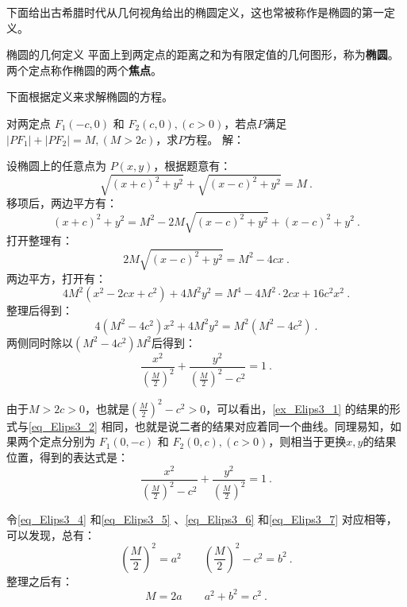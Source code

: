 {下面给出古希腊时代从几何视角给出的椭圆定义，这也常被称作是椭圆的第一定义。

\begin{definition}{椭圆的几何定义}
平面上到两定点的距离之和为有限定值的几何图形，称为\textbf{椭圆}。两个定点称作椭圆的两个\textbf{焦点}。
\end{definition}

下面根据定义来求解椭圆的方程。

\begin{example}{对两定点 $F_1(-c, 0)$ 和 $F_2(c, 0),(c>0)$，若点$P$满足$|PF_1| + |PF_2| = M,(M > 2c)$，求$P$方程。}\label{ex_Elips3_1}
解：

设椭圆上的任意点为 $P(x, y)$，根据题意有：
\begin{equation}
\sqrt{(x + c)^2 + y^2} + \sqrt{(x - c)^2 + y^2} = M~.
\end{equation}
移项后，两边平方有：
\begin{equation}
(x + c)^2 + y^2 = M^2 - 2M\sqrt{(x - c)^2 + y^2} + (x - c)^2 + y^2~.
\end{equation}
打开整理有：
\begin{equation}
2M\sqrt{(x - c)^2 + y^2}= M^2 - 4cx~.
\end{equation}
两边平方，打开有：
\begin{equation}
4M^2(x^2 - 2cx+c^2) + 4M^2y^2= M^4-4M^2\cdot2cx+16c^2x^2~.
\end{equation}
整理后得到：
\begin{equation}
4(M^2 -4c^2)x^2 + 4M^2y^2= M^2(M^2-4c^2)~.
\end{equation}
两侧同时除以$(M^2-4c^2)M^2$后得到：
\begin{equation}\label{eq_Elips3_4}
\frac{x^2}{\left(\displaystyle\frac{M}{2}\right)^2} + \frac{y^2}{\displaystyle\left(\frac{M}{2}\right)^2-c^2}=1~.
\end{equation}
\end{example}

由于$M>2c>0$，也就是$\displaystyle\left(\frac{M}{2}\right)^2-c^2>0$，可以看出，\autoref{ex_Elips3_1} 的结果的形式与\autoref{eq_Elips3_2} 相同，也就是说二者的结果对应着同一个曲线。同理易知，如果两个定点分别为 $F_1(0,-c)$ 和 $F_2(0,c),(c>0)$，则相当于更换$x,y$的结果位置，得到的表达式是：
\begin{equation}\label{eq_Elips3_6}
\frac{x^2}{\displaystyle\left(\frac{M}{2}\right)^2-c^2}+\frac{y^2}{\left(\displaystyle\frac{M}{2}\right)^2} =1~.
\end{equation}

令\autoref{eq_Elips3_4} 和\autoref{eq_Elips3_5} 、\autoref{eq_Elips3_6} 和\autoref{eq_Elips3_7} 对应相等，可以发现，总有：
\begin{equation}
\left(\frac{M}{2}\right)^2=a^2\qquad
\left(\frac{M}{2}\right)^2-c^2=b^2~.
\end{equation}
整理之后有：
\begin{equation}
M=2a\qquad
a^2+b^2=c^2~.
\end{equation}

}

